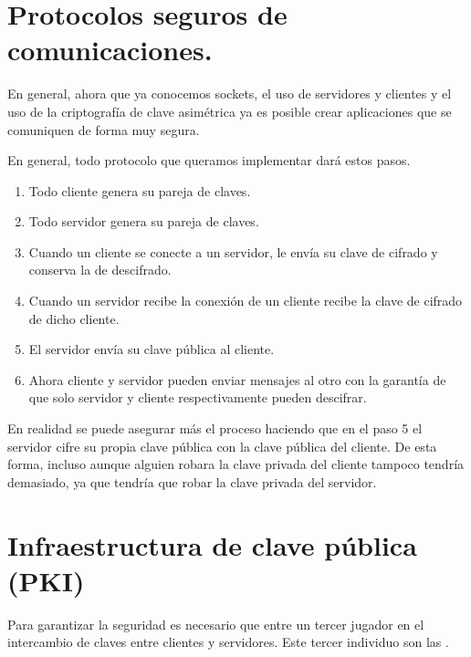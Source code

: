 \documentclass[letterpaper,10pt,spanish]{sphinxmanual}
\begin{document}
\section{Protocolos seguros de comunicaciones.}
\label{\detokenize{textos/tema5:protocolos-seguros-de-comunicaciones}}
En general, ahora que ya conocemos sockets, el uso de servidores y clientes y el uso de la criptografía de clave asimétrica ya es posible crear aplicaciones que se comuniquen de forma muy segura.

En general, todo protocolo que queramos implementar dará estos pasos.
\begin{enumerate}
%
\item {} 
Todo cliente genera su pareja de claves.

\item {} 
Todo servidor genera su pareja de claves.

\item {} 
Cuando un cliente se conecte a un servidor, le envía su clave de cifrado y conserva la de descifrado.

\item {} 
Cuando un servidor recibe la conexión de un cliente recibe la clave de cifrado de dicho cliente.

\item {} 
El servidor envía su clave pública al cliente.

\item {} 
Ahora cliente y servidor pueden enviar mensajes al otro con la garantía de que solo servidor y cliente respectivamente pueden descifrar.

\end{enumerate}

En realidad se puede asegurar más el proceso haciendo que en el paso 5 el servidor cifre su propia clave pública con la clave pública del cliente. De esta forma, incluso aunque alguien robara la clave privada del cliente tampoco tendría demasiado, ya que tendría que robar la clave privada del servidor.


\section{Infraestructura de clave pública (PKI)}
\label{\detokenize{textos/tema5:infraestructura-de-clave-publica-pki}}
Para garantizar la seguridad es necesario que entre un tercer jugador en el intercambio de claves entre clientes y servidores. Este tercer individuo son las  .
\end{document}
